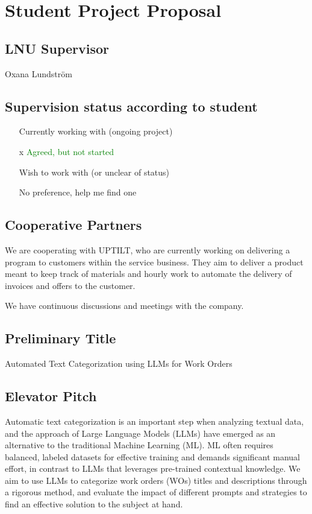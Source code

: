\section{Student Project Proposal}

\subsection{LNU Supervisor}
Oxana Lundström

\subsection{Supervision status according to student}

\begin{itemize}
      \item [ ] Currently working with (ongoing project)
      \item [x] \textcolor{green}{Agreed, but not started}
      \item [ ] Wish to work with (or unclear of status)
      \item [ ] No preference, help me find one
\end{itemize}

\subsection{Cooperative Partners}

We are cooperating with UPTILT, who are currently working on delivering a
program to customers within the service business.
They aim to deliver a product meant to keep track of materials and hourly work
to automate the delivery of invoices and offers to the customer.

We have continuous discussions and meetings with the company.

\subsection{Preliminary Title}

Automated Text Categorization using LLMs for Work Orders

\subsection{Elevator Pitch}

Automatic text categorization is an important step when analyzing textual data,
and the approach of Large Language Models (LLMs) have emerged as an alternative
to the traditional Machine Learning (ML).
ML often requires balanced, labeled datasets for effective training
and demands significant manual effort, in contrast to LLMs that
leverages pre-trained contextual knowledge.
We aim to use LLMs to categorize work orders (WOs) titles and descriptions
through a rigorous method,
and evaluate the impact of different prompts and strategies to find
an effective solution to the subject at hand.

